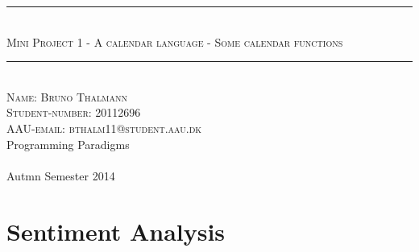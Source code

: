 


\begin{titlepage}
\newcommand{\HRule}{\rule{\linewidth}{0.5mm}}

\begin{center}

\HRule \\[0.5cm]
\textsc{ \Huge Mini Project 1 - A calendar language - Some calendar functions}\\

\HRule \\[3cm]

\textsc{\Large Name: Bruno Thalmann} \\[1cm]
\textsc{\Large Student-number: 20112696} \\[1cm]
\textsc{\Large AAU-email: bthalm11@student.aau.dk} \\[2cm]


\vfill
{\Large Programming Paradigms}
\\ ~\\
{\large Autmn Semester 2014}

\end{center}
\end{titlepage}



%


\setcounter{tocdepth}{1}
\tableofcontents

\clearpage



\clearpage


\chapter{Sentiment Analysis}


%



\label{LastPage}

